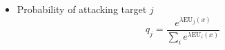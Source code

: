 \begin{itemize}
  \item Probability of attacking target $j$
    \[ q_j = \frac{e^{\lambda \mathrm{EU}_j(x)}}
                  {\sum_i e^{\lambda \mathrm{EU}_i(x)}} \]
\end{itemize}
